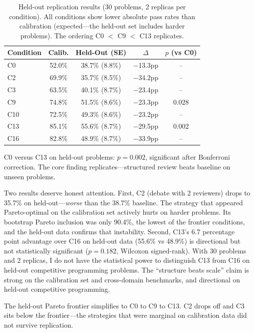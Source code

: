 \documentclass{article}
\begin{document}
\begin{table}[t]
\centering
\caption{Held-out replication results (30 problems, 2 replicas per condition). All conditions show lower absolute pass rates than calibration (expected---the held-out set includes harder problems). The ordering C0 $<$ C9 $<$ C13 replicates.}
\label{tab:heldout}
\small
\begin{tabular}{lcccc}
\toprule
Condition & Calib. & Held-Out (SE) & $\Delta$ & $p$ (vs C0) \\
\midrule
C0  & 52.0\% & 38.7\% (8.8\%) & $-$13.3pp & -- \\
C2  & 69.9\% & 35.7\% (8.5\%) & $-$34.2pp & -- \\
C3  & 63.5\% & 40.1\% (8.7\%) & $-$23.4pp & -- \\
C9  & 74.8\% & 51.5\% (8.6\%) & $-$23.3pp & 0.028 \\
C10 & 72.5\% & 49.3\% (8.6\%) & $-$23.2pp & -- \\
C13 & 85.1\% & 55.6\% (8.7\%) & $-$29.5pp & 0.002 \\
C16 & 82.8\% & 48.9\% (8.7\%) & $-$33.9pp & -- \\
\bottomrule
\end{tabular}
\end{table}

C0 versus C13 on held-out problems: $p=0.002$, significant after Bonferroni correction. The core finding replicates---structured review beats baseline on unseen problems.

Two results deserve honest attention. First, C2 (debate with 2 reviewers) drops to 35.7\% on held-out---\emph{worse} than the 38.7\% baseline. The strategy that appeared Pareto-optimal on the calibration set actively hurts on harder problems. Its bootstrap Pareto inclusion was only 90.4\%, the lowest of the frontier conditions, and the held-out data confirms that instability. Second, C13's 6.7 percentage point advantage over C16 on held-out data (55.6\% vs 48.9\%) is directional but not statistically significant ($p=0.182$, Wilcoxon signed-rank). With 30 problems and 2 replicas, I do not have the statistical power to distinguish C13 from C16 on held-out competitive programming problems. The ``structure beats scale'' claim is strong on the calibration set and cross-domain benchmarks, and directional on held-out competitive programming.

The held-out Pareto frontier simplifies to C0 to C9 to C13. C2 drops off and C3 sits below the frontier---the strategies that were marginal on calibration data did not survive replication.
\end{document}
